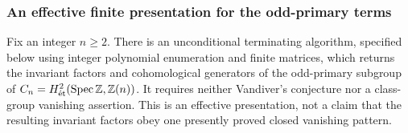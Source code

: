 \subsubsection{An effective finite presentation for the odd-primary terms}
\begin{theorem}
\label{thm:B-effective-odd-torsion}
Fix an integer \(n\ge2\).  There is an unconditional terminating
algorithm, specified below using integer polynomial enumeration and
finite matrices, which returns the invariant factors and cohomological
generators of the odd-primary subgroup of
\(C_n=H^2_{\mathrm{\acute et}}(\operatorname{Spec}\mathbb Z,\mathbb Z(n))\).  It requires neither Vandiver's
conjecture nor a class-group vanishing assertion.  This is an effective
presentation, not a claim that the resulting invariant factors obey
one presently proved closed vanishing pattern.
\end{theorem}
